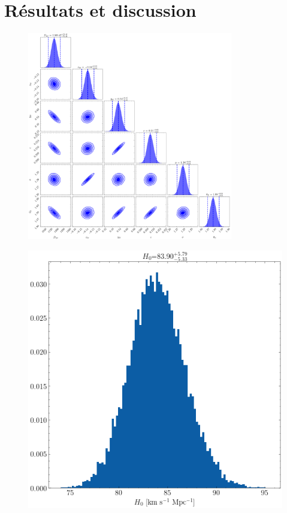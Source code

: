 \documentclass[times,10pt,twocolumn]{article}
\begin{document}
\section{Résultats et discussion}\label{sec:resultats}
\begin{figure}[hb]
        \centering
        \includegraphics[width=0.8\textwidth]{corner_plot_joint}
        \caption{}
        \label{fig:cornerplot}
\end{figure}

\begin{figure}[H]
        \centering
        \includegraphics[width=0.8\linewidth]{marginalized_posterior_H0}
        \caption{}
        \label{fig:}
\end{figure}
\end{document}
